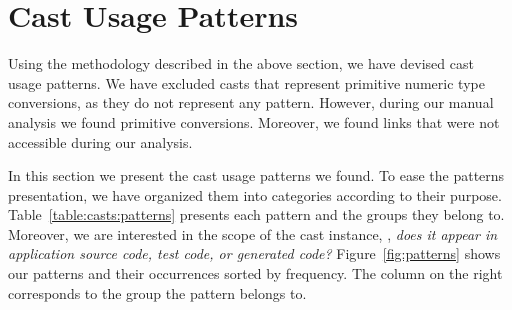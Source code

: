 
\newcommand{\castpatternsection}[1]{\noindent\textbf{#1.}}
\newcommand{\pname}[1]{\textsc{#1}}
\newcommand{\group}[1]{

\

\

{\noindent\Large Patterns for \textsc{#1}}

\

\begin{figure}[ht!]
\centering
\texttt{[image: "analysis/table-patterns-5000-by-group-\#1"]}
\caption{#1 Cast Pattern Occurrences}
\label{fig:group-patterns:#1}
\end{figure}

}

\newenvironment{pattern}[1]{
	\newcommand{\desc}{\castpatternsection{Description}}
	\newcommand{\instances}{\castpatternsection{Instances}}
	\newcommand{\detection}{\castpatternsection{Detection}}
	\newcommand{\discussion}{\castpatternsection{Discussion}}
	\newcommand{\related}{\castpatternsection{Related Patterns}}
    \newcommand{\thisp}{\textsc{#1}}
    \subsection{\pname{#1}}
    \label{pat:#1}
	\desc
}{}


\section{Cast Usage Patterns}
\label{sec:casts:patterns}

%
Using the methodology described in the above section,
we have devised \npattern{} cast usage patterns.
We have excluded casts that represent primitive numeric type conversions,
as they do not represent any pattern.
However, during our manual analysis we found \nprim{} primitive conversions.
Moreover, we found \nbrokenlinks{} links that were not accessible during our analysis.

In this section we present the cast usage patterns we found.
To ease the patterns presentation,
%
%
we have organized them into \ngroup{} categories according to their purpose.
Table~\ref{table:casts:patterns} presents each pattern and the groups they belong to.
Moreover, we are interested in the scope of the cast instance,
\ie, \emph{does it appear in application source code, test code, or generated code?}
%
%
Figure~\ref{fig:patterns} shows our patterns and their occurrences sorted by frequency.
The column on the right corresponds to the group the pattern belongs to.

